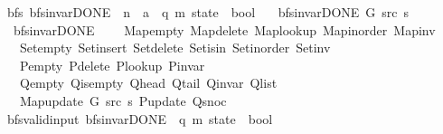 \begin{isabellebody}
\isamarkupfalse%
\ {\isacharparenleft}{\kern0pt}\ bfs{\isacharparenright}{\kern0pt}\ bfs{\isacharunderscore}{\kern0pt}invar{\isacharunderscore}{\kern0pt}DONE{\isacharprime}{\kern0pt}\ {\isacharcolon}{\kern0pt}{\isacharcolon}{\kern0pt}\ {\isachardoublequoteopen}{\isacharprime}{\kern0pt}n\ {\isasymRightarrow}\ {\isacharprime}{\kern0pt}a\ {\isasymRightarrow}\ {\isacharparenleft}{\kern0pt}{\isacharprime}{\kern0pt}q{\isacharcomma}{\kern0pt}\ {\isacharprime}{\kern0pt}m{\isacharparenright}{\kern0pt}\ state\ {\isasymRightarrow}\ bool{\isachardoublequoteclose}\ \isanewline
\ \ {\isachardoublequoteopen}bfs{\isacharunderscore}{\kern0pt}invar{\isacharunderscore}{\kern0pt}DONE{\isacharprime}{\kern0pt}\ G\ src\ s\ {\isasymequiv}\isanewline
\ \ \ bfs{\isacharunderscore}{\kern0pt}invar{\isacharunderscore}{\kern0pt}DONE\isanewline
\ \ \ \ Map{\isacharunderscore}{\kern0pt}empty\ Map{\isacharunderscore}{\kern0pt}delete\ Map{\isacharunderscore}{\kern0pt}lookup\ Map{\isacharunderscore}{\kern0pt}inorder\ Map{\isacharunderscore}{\kern0pt}inv\isanewline
\ \ \ \ Set{\isacharunderscore}{\kern0pt}empty\ Set{\isacharunderscore}{\kern0pt}insert\ Set{\isacharunderscore}{\kern0pt}delete\ Set{\isacharunderscore}{\kern0pt}isin\ Set{\isacharunderscore}{\kern0pt}inorder\ Set{\isacharunderscore}{\kern0pt}inv\isanewline
\ \ \ \ P{\isacharunderscore}{\kern0pt}empty\ P{\isacharunderscore}{\kern0pt}delete\ P{\isacharunderscore}{\kern0pt}lookup\ P{\isacharunderscore}{\kern0pt}invar\isanewline
\ \ \ \ Q{\isacharunderscore}{\kern0pt}empty\ Q{\isacharunderscore}{\kern0pt}is{\isacharunderscore}{\kern0pt}empty\ Q{\isacharunderscore}{\kern0pt}head\ Q{\isacharunderscore}{\kern0pt}tail\ Q{\isacharunderscore}{\kern0pt}invar\ Q{\isacharunderscore}{\kern0pt}list\isanewline
\ \ \ \ Map{\isacharunderscore}{\kern0pt}update\ G\ src\ s\ P{\isacharunderscore}{\kern0pt}update\ Q{\isacharunderscore}{\kern0pt}snoc{\isachardoublequoteclose}\isanewline
\isanewline
{}\isamarkupfalse%
\ {\isacharparenleft}{\kern0pt}\ bfs{\isacharunderscore}{\kern0pt}valid{\isacharunderscore}{\kern0pt}input{\isacharparenright}{\kern0pt}\ bfs{\isacharunderscore}{\kern0pt}invar{\isacharunderscore}{\kern0pt}DONE{\isacharprime}{\kern0pt}{\isacharprime}{\kern0pt}\ {\isacharcolon}{\kern0pt}{\isacharcolon}{\kern0pt}\ {\isachardoublequoteopen}{\isacharparenleft}{\kern0pt}{\isacharprime}{\kern0pt}q{\isacharcomma}{\kern0pt}\ {\isacharprime}{\kern0pt}m{\isacharparenright}{\kern0pt}\ state\ {\isasymRightarrow}\ bool{\isachardoublequoteclose}\ \isanewline

\end{isabellebody}
